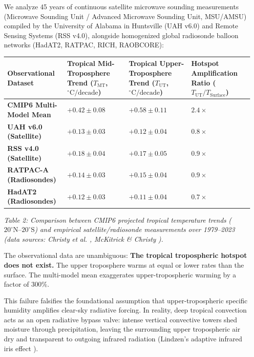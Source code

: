 \documentclass[10pt,twocolumn]{article}
\begin{document}
We analyze 45 years of continuous satellite microwave sounding measurements (Microwave Sounding Unit / Advanced Microwave Sounding Unit, MSU/AMSU) compiled by the University of Alabama in Huntsville (UAH v6.0) \cite{SpencerChristy2017} and Remote Sensing Systems (RSS v4.0), alongside homogenized global radiosonde balloon networks (HadAT2, RATPAC, RICH, RAOBCORE):

\begin{table}[htbp]
\centering
\small
\begin{tabular}{llll}
\toprule
Observational Dataset & Tropical Mid-Troposphere Trend ($T_{\text{MT}}$, $^\circ\text{C}/\text{decade}$) & Tropical Upper-Troposphere Trend ($T_{\text{UT}}$, $^\circ\text{C}/\text{decade}$) & Hotspot Amplification Ratio ($T_{\text{UT}} / T_{\text{Surface}}$) \\
\midrule
\textbf{CMIP6 Multi-Model Mean} & $+0.42 \pm 0.08$ & $+0.58 \pm 0.11$ & $\mathbf{2.4\times}$ \\
\textbf{UAH v6.0 (Satellite)} & $+0.13 \pm 0.03$ & $+0.12 \pm 0.04$ & $\mathbf{0.8\times}$ \\
\textbf{RSS v4.0 (Satellite)} & $+0.18 \pm 0.04$ & $+0.17 \pm 0.05$ & $\mathbf{0.9\times}$ \\
\textbf{RATPAC-A (Radiosondes)} & $+0.14 \pm 0.03$ & $+0.15 \pm 0.04$ & $\mathbf{0.9\times}$ \\
\textbf{HadAT2 (Radiosondes)} & $+0.12 \pm 0.03$ & $+0.11 \pm 0.04$ & $\mathbf{0.7\times}$ \\
\bottomrule
\end{tabular}
\end{table}

\textit{Table 2: Comparison between CMIP6 projected tropical temperature trends ($20^\circ\text{N}\text{--}20^\circ\text{S}$) and empirical satellite/radiosonde measurements over 1979–2023 (data sources: Christy et al. \cite{Christy2018}, McKitrick & Christy \cite{McKitrickChristy2018}).}

The observational data are unambiguous: \textbf{The tropical tropospheric hotspot does not exist.} The upper troposphere warms at equal or lower rates than the surface. The multi-model mean exaggerates upper-tropospheric warming by a factor of $300\%$.

This failure falsifies the foundational assumption that upper-tropospheric specific humidity amplifies clear-sky radiative forcing. In reality, deep tropical convection acts as an open radiative bypass valve: intense vertical convective towers shed moisture through precipitation, leaving the surrounding upper tropospheric air dry and transparent to outgoing infrared radiation (Lindzen’s adaptive infrared iris effect \cite{Lindzen2001}).
\end{document}
